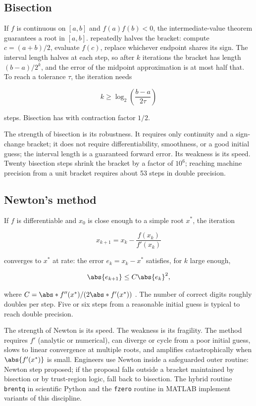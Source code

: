 \subsection{Bisection}

If $f$ is continuous on $[a, b]$ and $f(a) f(b) < 0$, the
intermediate-value theorem guarantees a root in $[a, b]$.
 repeatedly halves the bracket: compute
$c = (a + b)/2$, evaluate $f(c)$, replace whichever endpoint
shares its sign. The interval length halves at each step, so
after $k$ iterations the bracket has length $(b - a)/2^{k}$, and
the error of the midpoint approximation is at most half that.
To reach a tolerance $\tau$, the iteration needs

\[
k \geq \log_{2}\!\left(\frac{b - a}{2 \tau}\right)
\]

steps. Bisection has  with
contraction factor $1/2$.

The strength of bisection is its robustness. It requires only
continuity and a sign-change bracket; it does not require
differentiability, smoothness, or a good initial guess; the
interval length is a guaranteed forward error. Its weakness is
its speed. Twenty bisection steps shrink the bracket by a factor
of $10^{6}$; reaching machine precision from a unit bracket
requires about 53 steps in double precision.

\subsection{Newton's method}

If $f$ is differentiable and $x_{0}$ is close enough to a simple
root $x^{*}$, the iteration

\[
x_{k+1} = x_{k} - \frac{f(x_{k})}{f'(x_{k})}
\]

converges to $x^{*}$ at  rate: the error
$e_{k} = x_{k} - x^{*}$ satisfies, for $k$ large enough,

\[
\abs{e_{k+1}} \leq C \abs{e_{k}}^{2},
\]

where $C = \abs*{f''(x^{*})}/(2\abs*{f'(x^{*})})$
\cite[ch.~4]{text:moler-numerical}. The number of correct digits
roughly doubles per step. Five or six steps from a reasonable
initial guess is typical to reach double precision.

The strength of Newton is its speed. The weakness is its
fragility. The method requires $f'$ (analytic or numerical), can
diverge or cycle from a poor initial guess, slows to linear
convergence at multiple roots, and amplifies catastrophically when
$\abs{f'(x^{*})}$ is small. Engineers use Newton inside a
safeguarded outer routine: Newton step proposed; if the proposal
falls outside a bracket maintained by bisection or by trust-region
logic, fall back to bisection. The hybrid routine \texttt{brentq}
in scientific Python and the \texttt{fzero} routine in MATLAB
implement variants of this discipline.

